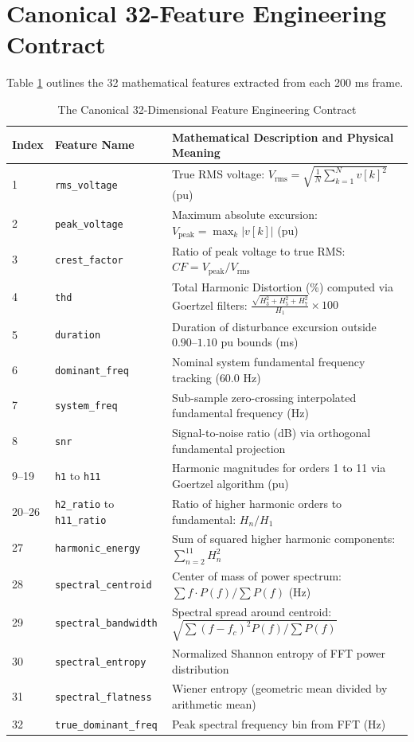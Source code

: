 \documentclass[12pt,a4paper]{report}
\begin{document}
\section{Canonical 32-Feature Engineering Contract}
Table \ref{tab:32_features} outlines the 32 mathematical features extracted from each 200 ms frame.

\begin{table}[H]
\centering
\caption{The Canonical 32-Dimensional Feature Engineering Contract}
\label{tab:32_features}
\small
\begin{tabularx}{\textwidth}{llX}
\toprule
\textbf{Index} & \textbf{Feature Name} & \textbf{Mathematical Description and Physical Meaning} \\
\midrule
1 & \texttt{rms\_voltage} & True RMS voltage: $V_{\text{rms}} = \sqrt{\frac{1}{N}\sum_{k=1}^N v[k]^2}$ (pu) \\
2 & \texttt{peak\_voltage} & Maximum absolute excursion: $V_{\text{peak}} = \max_k |v[k]|$ (pu) \\
3 & \texttt{crest\_factor} & Ratio of peak voltage to true RMS: $CF = V_{\text{peak}} / V_{\text{rms}}$ \\
4 & \texttt{thd} & Total Harmonic Distortion (\%) computed via Goertzel filters: $\frac{\sqrt{H_3^2+H_5^2+H_7^2}}{H_1} \times 100$ \\
5 & \texttt{duration} & Duration of disturbance excursion outside $0.90\text{--}1.10\text{ pu}$ bounds (ms) \\
6 & \texttt{dominant\_freq} & Nominal system fundamental frequency tracking ($60.0\text{ Hz}$) \\
7 & \texttt{system\_freq} & Sub-sample zero-crossing interpolated fundamental frequency (Hz) \\
8 & \texttt{snr} & Signal-to-noise ratio (dB) via orthogonal fundamental projection \\
9--19 & \texttt{h1} to \texttt{h11} & Harmonic magnitudes for orders 1 to 11 via Goertzel algorithm (pu) \\
20--26 & \texttt{h2\_ratio} to \texttt{h11\_ratio} & Ratio of higher harmonic orders to fundamental: $H_n / H_1$ \\
27 & \texttt{harmonic\_energy} & Sum of squared higher harmonic components: $\sum_{n=2}^{11} H_n^2$ \\
28 & \texttt{spectral\_centroid} & Center of mass of power spectrum: $\sum f \cdot P(f) / \sum P(f)$ (Hz) \\
29 & \texttt{spectral\_bandwidth} & Spectral spread around centroid: $\sqrt{\sum (f - f_c)^2 P(f) / \sum P(f)}$ \\
30 & \texttt{spectral\_entropy} & Normalized Shannon entropy of FFT power distribution \\
31 & \texttt{spectral\_flatness} & Wiener entropy (geometric mean divided by arithmetic mean) \\
32 & \texttt{true\_dominant\_freq} & Peak spectral frequency bin from FFT (Hz) \\
\bottomrule
\end{tabularx}
\end{table}
\end{document}
